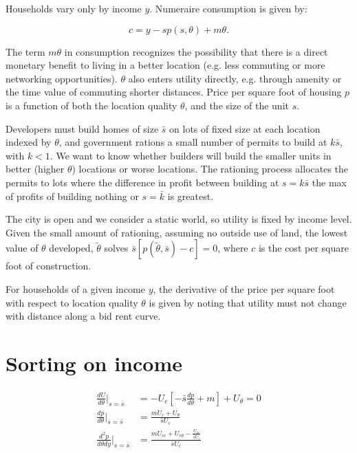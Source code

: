 \documentclass[12pt]{article}
\begin{document}
Households vary only by income $y$. Numeraire consumption is given by:

\begin{equation}
	c = y - sp(s,\theta)+m\theta.
\end{equation}

The term $m\theta$ in consumption recognizes the possibility that there is a
direct monetary benefit to living in a better location (e.g. less commuting or
more networking opportunities). $\theta$ also enters utility directly, e.g.
through amenity or the time value of commuting shorter distances. Price per
square foot of housing $p$ is a function of both the location quality $\theta$,
and the size of the unit $s$. 

Developers must build homes of size $\bar{s}$ on lots of fixed size at each
location indexed by $\theta$, and government rations a small number of permits
to build at $k\bar{s}$, with $k<1$. We want to know whether builders will build
the smaller units in better (higher $\theta$) locations or worse locations. The
rationing process allocates the permits to lots where the difference in profit
between building at $s=k\bar{s}$  the max of profits of building nothing or
$s=\bar{k}$ is greatest. 

The city is open and we consider a static world, so utility is fixed by income
level. Given the small amount of rationing, assuming no outside use of land,
the lowest value of $\theta$ developed, $\tilde{\theta}$ solves
$\bar{s}\left[p(\tilde{\theta},\bar{s})-c\right]=0$, where $c$ is the cost per
square foot of construction.  

For households of a given income $y$, the derivative of the price per square
foot with respect to location quality $\theta$ is given by noting that utility
must not change with distance along a bid rent curve.

\section{Sorting on income}
\begin{align}
	\frac{dU}{d\theta}|_{s=\bar{s}} &= -U_{c}\left[-\bar{s}\frac{dp}{d\theta}+m\right]+U_{\theta} = 0 \\
	\frac{dp}{d\theta}|_{s=\bar{s}} &= \frac{mU_{c}+U_{\theta}}{\bar{s} U_c}\\
\frac{d^{2}p}{d\theta dy}|_{s=\bar{s}} & = \frac{mU_{cc} + U_{c\theta} -\frac{U_{cc}}{\bar{s}U_c}}{\bar{s}U_{c}}
\end{align}
\end{document}
